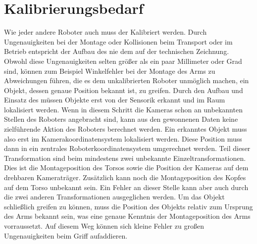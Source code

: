 \section{Kalibrierungsbedarf} %
\label{sec:Kalibrierungsbedarf}
Wie jeder andere Roboter auch muss der \cob Kalibriert werden. Durch Ungenauigkeiten bei 
der Montage oder Kollisionen beim Transport oder im Betrieb entspricht der Aufbau des \cob
nie dem auf der technischen Zeichnung. Obwohl diese Ungenauigkeiten selten größer als ein 
paar Millimeter oder Grad sind, können zum Beispiel Winkelfehler bei der Montage des Arms 
zu Abweichungen führen, die es dem unkalibrierten Roboter unmöglich machen, ein Objekt, dessen
genaue Position bekannt ist, zu greifen. Durch den Aufbau und Einsatz des \cob müssen 
Objekte erst von der Sensorik erkannt und im Raum lokalisiert werden. Wenn in diesem Schritt 
die Kameras schon an unbekannten Stellen des Roboters angebracht sind, kann aus den gewonnenen
Daten keine zielführende Aktion des Roboters berechnet werden. Ein erkanntes Objekt muss also 
erst im Kamerakoordinatensystem lokalisiert werden. Diese Position muss dann in ein zentrales 
Roboterkoordinatensystem umgerechnet werden. Teil dieser Transformation sind beim \cob mindestens
zwei unbekannte Einzeltransformationen. Dies ist die Montageposition des Torsos sowie die 
Position der Kameras auf dem drehbaren Kameraträger. Zusätzlich kann noch die Montageposition
des Kopfes auf dem Torso unbekannt sein. Ein Fehler an dieser Stelle kann aber auch durch die
zwei anderen Transformationen ausgeglichen werden. Um das Objekt schließlich greifen zu können,
muss die Position des Objekts relativ zum Ursprung des Arms bekannt sein, was eine genaue
Kenntnis der Montageposition des Arms vorraussetzt. Auf diesem Weg können sich kleine Fehler
zu großen Ungenauigkeiten beim Griff aufaddieren.

